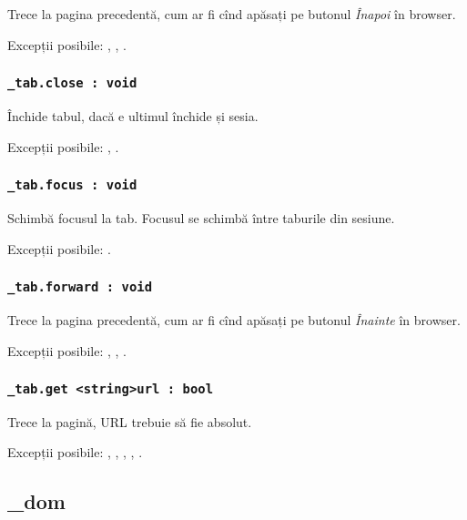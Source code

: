Trece la pagina precedentă, cum ar fi cînd apăsați pe butonul \textit{Înapoi} în browser.

Excepții posibile: , , .

\subsubsection{\lstinline|_tab.close : void|}

Închide tabul, dacă e ultimul închide și sesia.

Excepții posibile: , .

\subsubsection{\lstinline|_tab.focus : void|}

Schimbă focusul la tab. Focusul se schimbă între taburile din sesiune.

Excepții posibile: .

\subsubsection{\lstinline|_tab.forward : void|}

Trece la pagina precedentă, cum ar fi cînd apăsați pe butonul \textit{Înainte} în browser.


Excepții posibile: , , .

\subsubsection{\lstinline|_tab.get <string>url : bool|}

Trece la pagină, URL trebuie să fie absolut.

Excepții posibile: , , , , .

\subsection{{\color{orange} \_dom}}

